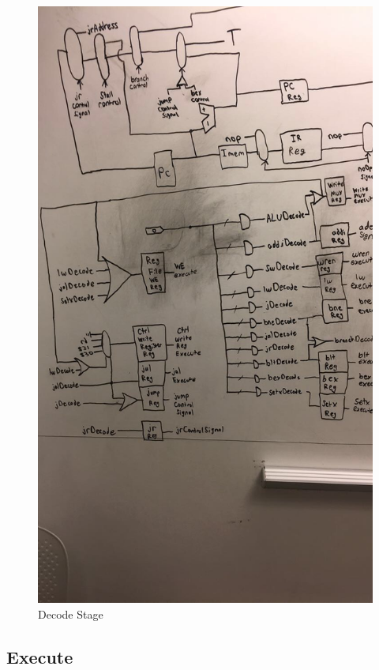 \documentclass[letterpaper]{article} %
\begin{document}
  \begin{figure}[!htb]
        \includegraphics[scale=.4]{Decode2.jpg}
        \caption{Decode Stage}
        \label{fig:2}
    \end{figure}
    
       \FloatBarrier
    
    
    
\subsection{Execute}
\end{document}
